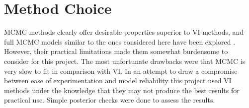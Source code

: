 \section{Method Choice}

MCMC methods clearly offer desirable properties superior to VI methods, and full MCMC models similar to the ones considered here have been explored \cite{Flaxman2015FastHG}. However, their practical limitations made them somewhat burdensome to consider for this project. The most unfortunate drawbacks were that MCMC is very slow to fit in comparison with VI. In an attempt to draw a compromise between ease of experimentation and model reliability this project used VI methods under the knowledge that they may not produce the best results for practical use. Simple posterior checks were done to assess the results.

